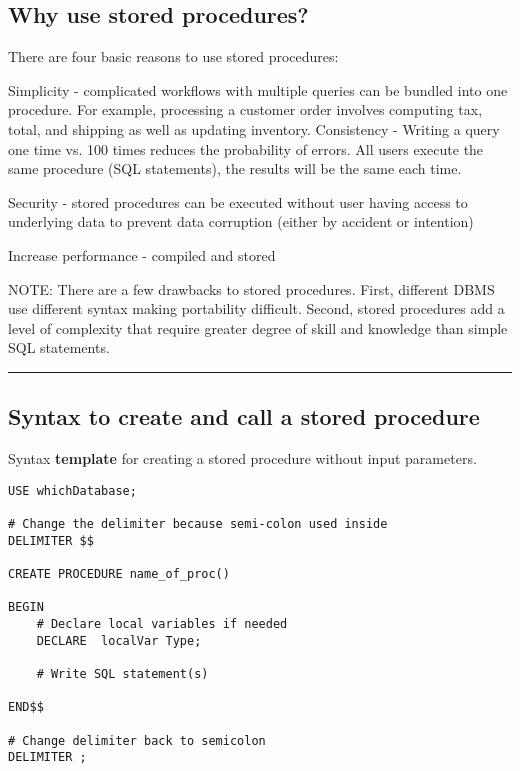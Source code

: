 \documentclass{article}
\begin{document}
\subsection*{Why use stored procedures?}
There are four basic reasons to use stored procedures: 
\begin{outline}
        \1  Simplicity - complicated workflows with multiple queries can be bundled into one procedure.  
        		\2 For example, processing a customer order involves computing tax, total, and shipping as well as updating inventory.
	\1 Consistency - Writing a query one time vs. 100 times  reduces the probability of errors.  All users execute the same procedure (SQL statements), the results will be the same each time.  
	
	\1 Security - stored procedures can be executed without user having access to underlying data to prevent data corruption (either by accident or intention)

	\1 Increase performance - compiled and stored 
     		 	 
\end{outline}


\noindent NOTE: There are a few drawbacks to stored procedures.  First,  different DBMS use different syntax making portability difficult.  Second, stored procedures add a level of complexity that require greater degree of skill and knowledge than simple SQL statements.  

\hspace{-0.5cm}\rule[-0.101in]{\textwidth}{0.0025in}
  
  












\subsection*{Syntax to create and call a stored procedure}

Syntax \textbf{template} for creating a stored procedure without input parameters.

\begin{lstlisting}[frame=single]  
USE whichDatabase;

# Change the delimiter because semi-colon used inside
DELIMITER $$

CREATE PROCEDURE name_of_proc()

BEGIN
	# Declare local variables if needed
	DECLARE  localVar Type;
	
	# Write SQL statement(s)
	
END$$

# Change delimiter back to semicolon
DELIMITER ;
\end{lstlisting} 
\end{document}
